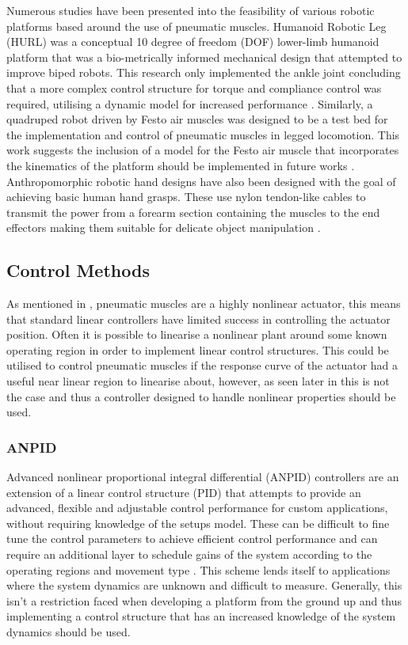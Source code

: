 \documentclass[11pt,a4paper]{article}
\begin{document}
Numerous studies have been presented into the feasibility of various robotic platforms based around the use of pneumatic muscles. Humanoid Robotic Leg (HURL) was a conceptual 10 degree of freedom (DOF) lower-limb humanoid platform that was a bio-metrically informed mechanical design that attempted to improve biped robots. This research only implemented the ankle joint concluding that a more complex control structure for torque and compliance control was required, utilising a dynamic model for increased performance \cite{andrikopoulos_nikolakopoulos_2017}. Similarly, a quadruped robot driven by Festo air muscles was designed to be a test bed for the implementation and control of pneumatic muscles in legged locomotion. This work suggests the inclusion of a model for the Festo air muscle that incorporates the kinematics of the platform should be implemented in future works \cite{aschenbeck_kern_bachmann_quinn}. Anthropomorphic robotic hand designs have also been designed with the goal of achieving basic human hand grasps. These use nylon tendon-like cables to transmit the power from a forearm section containing the muscles to the end effectors making them suitable for delicate object manipulation \cite{lau_chai_2012}.

\subsection{Control Methods}
\label{sub:control_methods}
As mentioned in , pneumatic muscles are a highly nonlinear actuator, this means that standard linear controllers have limited success in controlling the actuator position. Often it is possible to linearise a nonlinear plant around some known operating region in order to implement linear control structures. This could be utilised to control pneumatic muscles if the response curve of the actuator had a useful near linear region to linearise about, however, as seen later in  this is not the case and thus a controller designed to handle nonlinear properties should be used. 

\subsubsection{ANPID}
\label{sub:pid}
Advanced nonlinear proportional integral differential (ANPID) controllers are an extension of a linear control structure (PID) that attempts to provide an advanced, flexible and adjustable control performance for custom applications, without requiring knowledge of the setups model. These can be difficult to fine tune the control parameters to achieve efficient control performance and can require an additional layer to schedule gains of the system according to the operating regions and movement type \cite{andrikopoulos_nikolakopoulos_2017}. This scheme lends itself to applications where the system dynamics are unknown and difficult to measure. Generally, this isn't a restriction faced when developing a platform from the ground up and thus implementing a control structure that has an increased knowledge of the system dynamics should be used.
\end{document}
